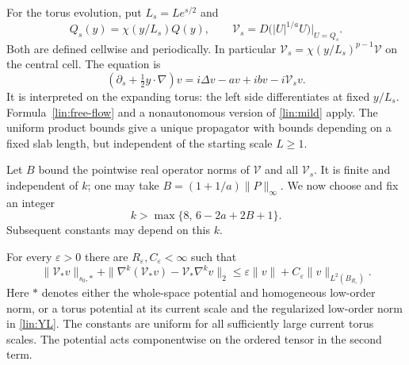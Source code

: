 For the torus evolution, put $L_s=Le^{s/2}$ and
\begin{equation}\label{lin:torus-coefficients}
 Q_s(y)=\chi(y/L_s)Q(y),\qquad
 \mathcal V_s=D\big(|U|^{1/a}U\big)\big|_{U=Q_s}.
\end{equation}
Both are defined cellwise and periodically.  In particular
$\mathcal V_s=\chi(y/L_s)^{p-1}\mathcal V$ on the central cell.
The equation is
\begin{equation}\label{lin:torus-evolution}
 (\partial_s+\tfrac12y\cdot\nabla)v
       =i\Delta v-a v+ibv-i\mathcal V_s v.
\end{equation}
It is interpreted on the expanding torus: the left side differentiates
at fixed $y/L_s$.  Formula~\eqref{lin:free-flow} and a nonautonomous
version of \eqref{lin:mild} apply.  The uniform product bounds give a
unique propagator with bounds depending on a fixed slab length, but
independent of the starting scale $L\ge1$.

Let $B$ bound the pointwise real operator norms of $\mathcal V$ and all
$\mathcal V_s$.  It is finite and independent of $k$; one may take
$B=(1+1/a)\|P\|_\infty$.  We now choose and fix an integer
\begin{equation}\label{lin:k-choice}
 k>\max\{8,\,6-2a+2B+1\}.
\end{equation}
Subsequent constants may depend on this $k$.

\begin{lemma}\label{lin:compact-error}
For every $\varepsilon>0$ there are $R_\varepsilon,C_\varepsilon<\infty$
such that
\begin{equation}\label{lin:compact-bound}
 \|\mathcal V_*v\|_{s_0,*}
 +\|\nabla^k(\mathcal V_*v)-\mathcal V_*\nabla^kv\|_2
 \le\varepsilon\|v\|+C_\varepsilon\|v\|_{L^2(B_{R_\varepsilon})}.
\end{equation}
Here $*$ denotes either the whole-space potential and homogeneous
low-order norm, or a torus potential at its current scale and the
regularized low-order norm in \eqref{lin:YL}.  The constants are uniform
for all sufficiently large current torus scales.  The potential acts
componentwise on the ordered tensor in the second term.
\end{lemma}

